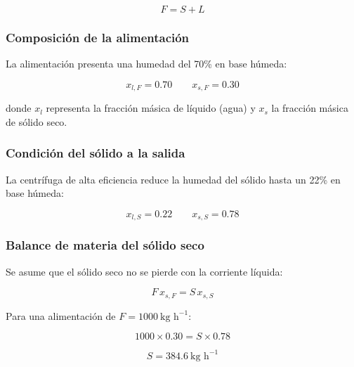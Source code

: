 \documentclass{report}
\begin{document}
\begin{equation}
F = S + L
\end{equation}



\subsubsection{Composición de la alimentación}

La alimentación presenta una humedad del 70\% en base húmeda:

\begin{equation}
x_{l,F} = 0.70 \qquad x_{s,F} = 0.30
\end{equation}

donde $x_{l}$ representa la fracción másica de líquido (agua) y
$x_{s}$ la fracción másica de sólido seco.



\subsubsection{Condición del sólido a la salida}

La centrífuga de alta eficiencia reduce la humedad del sólido hasta un
22\% en base húmeda:

\begin{equation}
x_{l,S} = 0.22 \qquad x_{s,S} = 0.78
\end{equation}



\subsubsection{Balance de materia del sólido seco}

Se asume que el sólido seco no se pierde con la corriente líquida:

\begin{equation}
F \, x_{s,F} = S \, x_{s,S}
\end{equation}

\noindent Para una alimentación de $F = 1000\ \text{kg h}^{-1}$:

\begin{equation}
1000 \times 0.30 = S \times 0.78
\end{equation}

\begin{equation}
S = 384.6\ \text{kg h}^{-1}
\end{equation}
\end{document}
